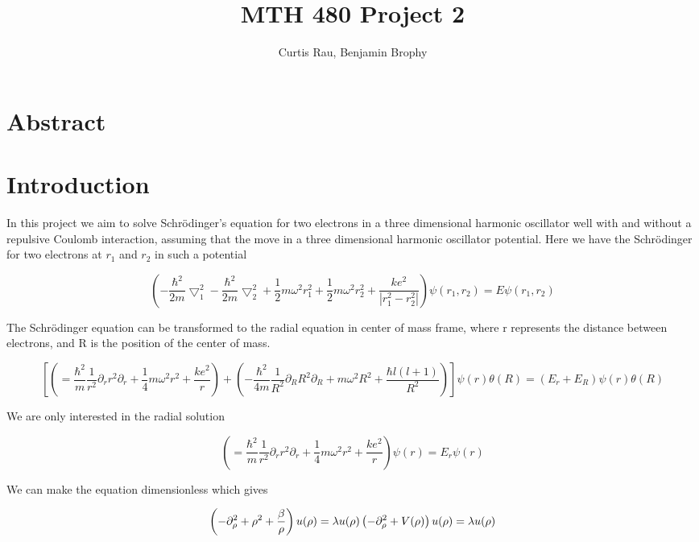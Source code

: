 \documentclass{article}
\begin{document}
	\title{MTH 480 Project 2}
	\author{Curtis Rau, Benjamin Brophy}
	\maketitle

\section{Abstract}

\section{Introduction}

In this project we aim to solve Schr\"{o}dinger's equation for two electrons in a three dimensional harmonic oscillator well with and without a repulsive Coulomb interaction, assuming that the move in a three dimensional harmonic oscillator potential. Here we have the Schr\"odinger for two electrons at $r_1$ and $r_2$ in such a potential

$$\left(-\frac{\hbar^2}{2m}\bigtriangledown_1^2
		-\frac{\hbar^2}{2m}\bigtriangledown_2^2
		+\frac{1}{2}m\omega^2r_1^2
		+\frac{1}{2}m\omega^2r_2^2
		+\frac{ke^2}{|r_1^2-r_2^2|}
		\right)
		\psi (r_1,r_2)  = E \psi (r_1,r_2)
		$$

The Schr\"{o}dinger equation can be transformed to the radial equation in center of mass frame, where r represents the distance between electrons, and R is the position of the center of mass.

\begin{equation}
	\left[ \left( = \frac{\hbar^2}{m} \frac{1}{r^2} \partial_r r^2 \partial_r + \frac{1}{4} m \omega^2 r^2 + \frac{k e^2}{r} \right) + \left( - \frac{\hbar^2}{4m} \frac{1}{R^2} \partial_R R^2 \partial_R + m\omega^2 R^2 + \frac{\hbar l(l+1)}{R^2} \right) \right] \psi (r) \theta (R)  = (E_r + E_R) \psi (r) \theta (R)
\end{equation}

We are only interested in the radial solution

\begin{equation}
\left( = \frac{\hbar^2}{m} \frac{1}{r^2} \partial_r r^2 \partial_r + \frac{1}{4} m \omega^2 r^2 + \frac{k e^2}{r} \right) \psi (r)  = E_r \psi (r)
\end{equation}

We can make the equation dimensionless which gives

\begin{equation}
\left( - \partial_\rho^2 + \rho^2 + \frac{\beta}{\rho} \right) u ( \rho ) = \lambda u(\rho ) \\
\left( - \partial_\rho^2 + V (\rho ) \right) u ( \rho ) = \lambda u(\rho )
\end{equation}
\end{document}
